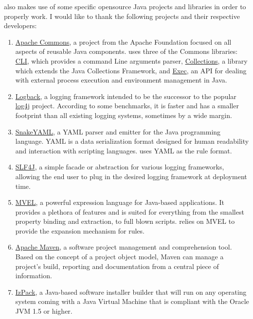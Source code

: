 \documentclass[a4paper,twoside,12pt]{memoir}
\begin{document}
\arara also makes use of some specific opensource Java projects and libraries in order to properly work. I would like to thank the following projects and their respective developers:

\begin{enumerate}
\item \href{http://commons.apache.org}{Apache Commons}, a project from the Apache Foundation focused on all aspects of reusable Java components. \arara uses three of the Commons libraries: \href{http://commons.apache.org/cli/}{CLI}, which provides a command Line arguments parser, \href{http://commons.apache.org/collections/}{Collections}, a library which  	extends the Java Collections Framework, and \href{http://commons.apache.org/exec/}{Exec}, an API for dealing with external process execution and environment management in Java.

\item \href{http://logback.qos.ch}{Logback}, a logging framework intended to be the successor to the popular \href{http://logging.apache.org/log4j/}{log4j} project. According to some benchmarks, it is faster and has a smaller footprint than all existing logging systems, sometimes by a wide margin.

\item \href{http://code.google.com/p/snakeyaml}{SnakeYAML}, a YAML parser and emitter for the Java programming language. YAML is a data serialization format designed for human readability and interaction with scripting languages. \arara uses YAML as the rule format.

\item \href{http://www.slf4j.org/}{SLF4J}, a simple facade or abstraction for various logging frameworks, allowing the end user to plug in the desired logging framework at deployment time.

\item \href{http://mvel.codehaus.org}{MVEL}, a powerful expression language for Java-based applications. It provides a plethora of features and is suited for everything from the smallest property binding and extraction, to full blown scripts. \arara relies on MVEL to provide the expansion mechanism for rules.

\item \href{http://maven.apache.org/}{Apache Maven}, a software project management and comprehension tool. Based on the concept of a project object model, Maven can manage a project's build, reporting and documentation from a central piece of information. 

\item \href{http://izpack.github.com}{IzPack}, a Java-based software installer builder that will run on any operating system coming with a Java Virtual Machine that is compliant with the Oracle JVM 1.5 or higher.
\end{enumerate}
\end{document}
